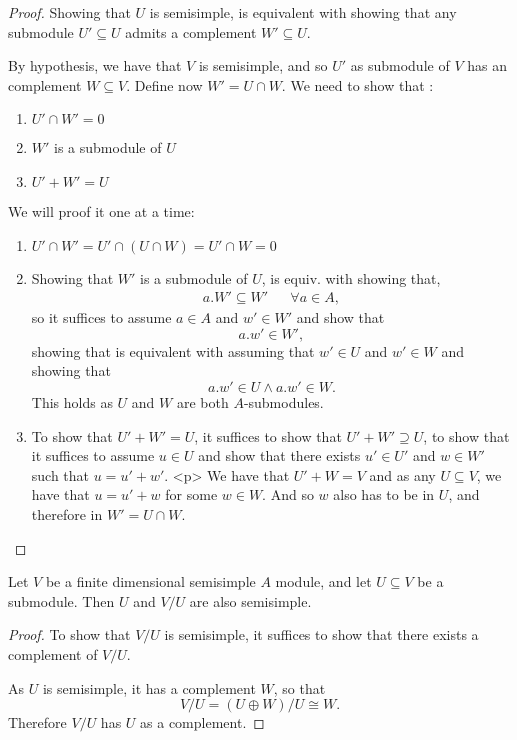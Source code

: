 \begin{proof}
Showing that \(U\) is semisimple, is equivalent with showing that any submodule \(U'\subseteq U\) admits a complement \(W'\subseteq U\).

By hypothesis, we have that \(V\) is semisimple, and so \(U'\) as submodule of \(V\) has an complement \(W\subseteq V\). Define now \(W'=U\cap W\). We need to show that :

\begin{enumerate}
  \item \(U'\cap W' =0\)
  \item \(W'\) is a submodule of \(U\)
  \item \(U'+W'=U\)
\end{enumerate}

We will proof it one at a time:

\begin{enumerate}
  \item \(U'\cap W'=U'\cap (U\cap W)=U'\cap W=0\)
  \item Showing that \(W'\) is a submodule of \(U\), is equiv. with showing that,
\begin{align*}
a.W'\subseteq W' && \forall a\in A,
\end{align*}
so it suffices to assume \(a\in A\) and \(w'\in W'\) and show that
\[
a.w'\in W',
\]
showing that is equivalent with assuming that \(w'\in U\) and \(w'\in W\) and showing that
\[
a.w'\in U \wedge  a.w'\in W.
\]
This holds as \(U\) and \(W\) are both \(A\)-submodules.
  \item To show that \(U'+W'=U\), it suffices to show that \(U'+W'\supseteq  U\), to show that it suffices to assume \(u\in U\) and show that there exists \(u'\in U'\) and \(w\in W'\) such that \(u=u'+w'\).  <p>
We have that \(U'+W=V\) and as any \(U\subseteq V\), we have that \(u=u'+w\) for some \(w\in W\). And so \(w\) also has to be in $U$, and therefore in $W'=U\cap W$.
\end{enumerate}

\end{proof}

\begin{prop}
Let \(V\) be a finite dimensional semisimple \(A\) module, and let \(U\subseteq V\) be a submodule. Then \(U\) and \(V/U\) are also semisimple.
\end{prop}

\begin{proof}
To show that \(V/U\) is semisimple, it suffices to show that there exists a complement of \(V/U\).

As \(U\) is semisimple, it has a complement \(W\), so that
\[
V/U=(U\oplus W)/U \cong W.
\]
Therefore \(V/U\) has \(U\) as a complement.
\end{proof}

